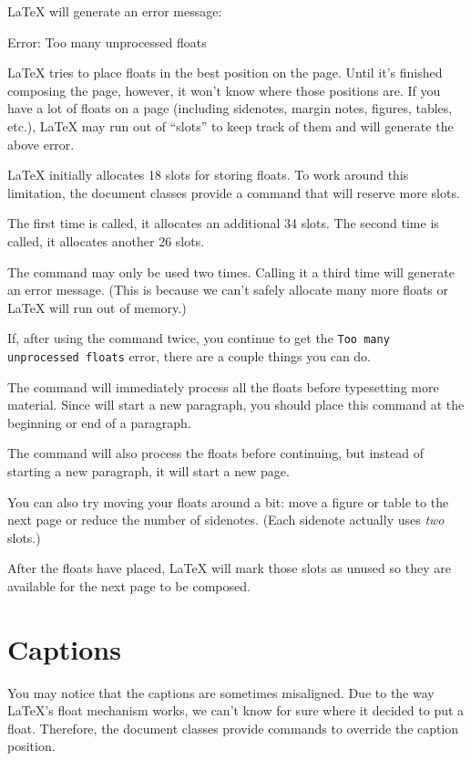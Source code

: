  \LaTeX{} will generate an error message:\label{err:too-many-floats}
\begin{docspec}
	Error: Too many unprocessed floats
\end{docspec}
\LaTeX{} tries to place floats in the best position on the page.  Until it's
finished composing the page, however, it won't know where those positions are.
If you have a lot of floats on a page (including sidenotes, margin notes,
figures, tables, etc.), \LaTeX{} may run out of ``slots'' to keep track of them
and will generate the above error.

\LaTeX{} initially allocates 18 slots for storing floats.  To work around this
limitation, the \TL document classes provide a  command
that will reserve more slots.

The first time  is called, it allocates an additional 34
slots.  The second time  is called, it allocates another 26
slots.

The  command may only be used two times.  Calling it a
third time will generate an error message.  (This is because we can't safely
allocate many more floats or \LaTeX{} will run out of memory.)

If, after using the  command twice, you continue to get the
\texttt{Too many unprocessed floats} error, there are a couple things you can
do.

The  command will immediately process all the floats
before typesetting more material.  Since  will start a new
paragraph, you should place this command at the beginning or end of a
paragraph.

The  command will also process the floats before
continuing, but instead of starting a new paragraph, it will start a new page.

You can also try moving your floats around a bit: move a figure or table to the
next page or reduce the number of sidenotes.  (Each sidenote actually uses
\emph{two} slots.)

After the floats have placed, \LaTeX{} will mark those slots as unused so they
are available for the next page to be composed.

\section{Captions}
You may notice that the captions are sometimes misaligned.
Due to the way \LaTeX's float mechanism works, we can't know for sure where it
decided to put a float. Therefore, the \TL document classes provide commands to
override the caption position.

